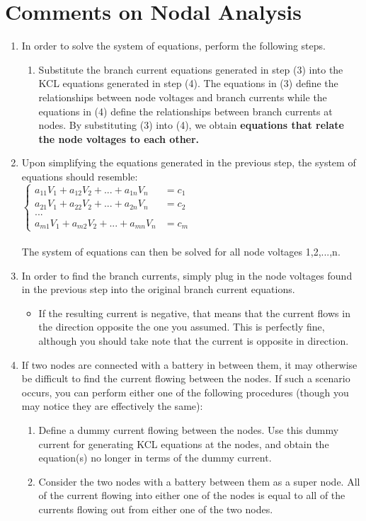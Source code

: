 \documentclass[12pt,letterpaper]{article}
\begin{document}
\section{Comments on Nodal Analysis}
	\begin{enumerate}
	\item In order to solve the system of equations, perform the following steps.
		\begin{enumerate}
		\item Substitute the branch current equations generated in step (3) into the KCL equations generated in step (4). The equations in (3) define the relationships between node voltages and branch currents while the equations in (4) define the relationships between branch currents at nodes. By substituting (3) into (4), we obtain \textbf{equations that relate the node voltages to each other.}
		\end{enumerate}
	\item Upon simplifying the equations generated in the previous step, the system of equations should resemble: \\
		$\begin{cases}
		a_{11}V_{1} + a_{12}V_{2} + ... + a_{1n}V_{n} &= c_{1} \\
		a_{21}V_{1} + a_{22}V_{2} + ... + a_{2n}V_{n} &= c_{2} \\
		... \\
		a_{m1}V_{1} + a_{m2}V_{2} + ... + a_{mn}V_{n} &= c_{m}
		\end{cases}$
		\\
		\\The system of equations can then be solved for all node voltages 1,2,...,n.
	\item In order to find the branch currents, simply plug in the node voltages found in the previous step into the original branch current equations.
		\begin{itemize}
		\item If the resulting current is negative, that means that the current flows in the direction opposite the one you assumed. This is perfectly fine, although you should take note that the current is opposite in direction.
		\end{itemize}
	\item If two nodes are connected with a battery in between them, it may otherwise be difficult to find the current flowing between the nodes. If such a scenario occurs, you can perform either one of the following procedures (though you may notice they are effectively the same):
		\begin{enumerate}
		\item Define a dummy current flowing between the nodes. Use this dummy current for generating KCL equations at the nodes, and obtain the equation(s) no longer in terms of the dummy current.
		\item Consider the two nodes with a battery between them as a super node. All of the current flowing into either one of the nodes is equal to all of the currents flowing out from either one of the two nodes.
		\end{enumerate}
	\end{enumerate}
\end{document}
